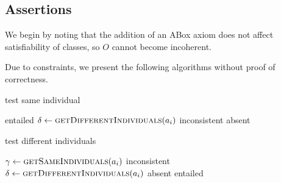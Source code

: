 \documentclass[paper.tex]{subfiles}
\begin{document}
\subsection{Assertions}
\label{sec:algorithms:assert}


We begin by noting that the addition of an ABox axiom does not affect satisfiability of classes, so $O$ cannot become incoherent.

Due to constraints, we present the following algorithms without proof of correctness.  

\begin{algorithm}[H]
  \caption{test same individual}
  \begin{algorithmic}[1]
    \raggedright
        \State \Return entailed
      \Else
          \State $\delta \gets \Call{getDifferentIndividuals}{a_i}$
            \State \Return inconsistent
          \EndIf
        \EndFor
        \State \Return absent
      \EndIf
    \EndFunction
  \end{algorithmic}
\end{algorithm}

\begin{algorithm}[H]
  \caption{test different individuals}
  \begin{algorithmic}[1]
    \raggedright
        \State $\gamma \gets \Call{getSameIndividuals}{a_i}$
          \State \Return inconsistent
        \EndIf
      \EndFor
        \State $\delta \gets \Call{getDifferentIndividuals}{a_i}$
          \State \Return absent
        \EndIf
      \EndFor
      \State \Return entailed
    \EndFunction
  \end{algorithmic}
\end{algorithm}
\end{document}
